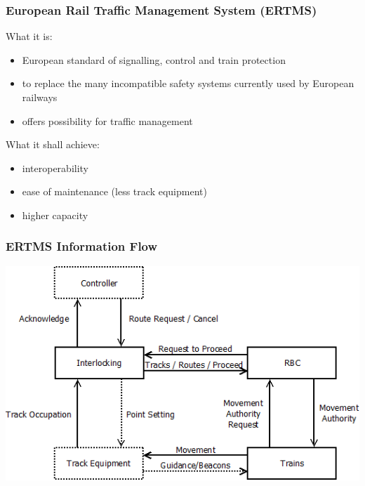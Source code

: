 \documentclass{beamer}
\begin{document}
\begin{frame}

\frametitle{European Rail Traffic Management System (ERTMS)}

What it is:
\begin{itemize}

\item
European standard of signalling, control and train protection 

\item
to replace the many incompatible safety systems currently used by
European railways

\item 
offers possibility for traffic management
\end{itemize}

\bigskip

What it shall achieve:
\begin{itemize}

\item 
interoperability

\item
ease of maintenance (less track equipment)

\item 
higher capacity

\end{itemize}

\end{frame}

\begin{frame}
\frametitle{ERTMS Information Flow}
\begin{center}
\includegraphics[scale=0.5]{wadtsiemens.png}
\end{center}
\end{frame}
\end{document}
